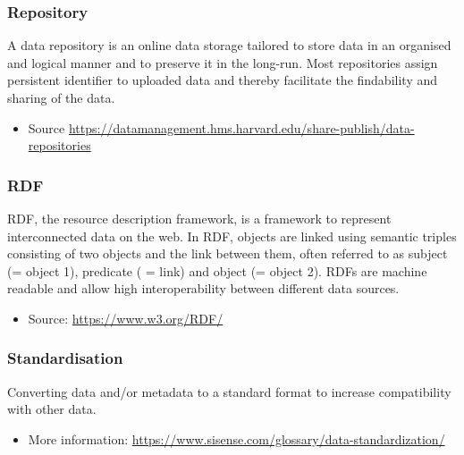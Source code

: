 \documentclass[
]{book}
\providecommand{\tightlist}{%
  \setlength{\itemsep}{0pt}\setlength{\parskip}{0pt}}
\begin{document}
\hypertarget{repository}{%
\subsubsection*{Repository}\label{repository}}

A data repository is an online data storage tailored to store data in an organised and logical manner and to preserve it in the long-run. Most repositories assign persistent identifier to uploaded data and thereby facilitate the findability and sharing of the data.

\begin{itemize}
\tightlist
\item
  Source \url{https://datamanagement.hms.harvard.edu/share-publish/data-repositories}
\end{itemize}

\hypertarget{RDF}{%
\subsubsection*{RDF}\label{RDF}}

RDF, the resource description framework, is a framework to represent interconnected data on the web. In RDF, objects are linked using semantic triples consisting of two objects and the link between them, often referred to as subject (= object 1), predicate ( = link) and object (= object 2). RDFs are machine readable and allow high interoperability between different data sources.

\begin{itemize}
\tightlist
\item
  Source: \url{https://www.w3.org/RDF/}
\end{itemize}

\hypertarget{standardise}{%
\subsubsection*{Standardisation}\label{standardise}}

Converting data and/or metadata to a standard format to increase compatibility with other data.

\begin{itemize}
\tightlist
\item
  More information: \url{https://www.sisense.com/glossary/data-standardization/}
\end{itemize}
\end{document}
